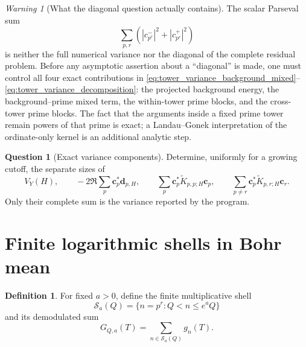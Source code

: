 \documentclass[11pt]{amsart}
\numberwithin{equation}{section}
\theoremstyle{plain}
\theoremstyle{definition}
\newtheorem{definition}[theorem]{Definition}
\newtheorem{question}[theorem]{Question}
\theoremstyle{remark}
\newtheorem{warning}[theorem]{Warning}
\newcommand{\1}{\mathbf{1}}
\begin{document}
\begin{warning}[What the diagonal question actually contains]
\label{warn:diagonal_issue}
The scalar Parseval sum
\begin{equation}
\sum_{p,r}
\left(|c_{p^r}^-|^2+|c_{p^r}^+|^2\right)
\label{eq:ordinary_parseval_diagonal}
\end{equation}
is neither the full numerical variance nor the diagonal of the complete
residual problem.  Before any asymptotic assertion about a ``diagonal'' is
made, one must control all four exact contributions in
\eqref{eq:tower_variance_background_mixed}--
\eqref{eq:tower_variance_decomposition}: the projected background energy,
the background--prime mixed term, the within-tower prime blocks, and the
cross-tower prime blocks.  The fact that the arguments inside a fixed
prime tower remain powers of that prime is exact; a Landau--Gonek
interpretation of the ordinate-only kernel is an additional analytic step.
\end{warning}

\begin{question}[Exact variance components]
\label{question:tower_block_energy}
Determine, uniformly for a growing cutoff, the separate sizes of
\begin{equation}
V_Y(H),
\qquad
-2\Re\sum_p\mathbf c_p^\ast\mathbf d_{p,H},
\qquad
\sum_p\mathbf c_p^\ast\widetilde K_{p,p;H}\mathbf c_p,
\qquad
\sum_{p\neq r}\mathbf c_p^\ast\widetilde K_{p,r;H}\mathbf c_r.
\label{eq:four_variance_components}
\end{equation}
Only their complete sum is the variance reported by the program.
\end{question}

\section{Finite logarithmic shells in Bohr mean}
\label{sec:shell_calculation}

\begin{definition}
\label{def:short_shell}
For fixed \(a>0\), define the finite multiplicative shell
\begin{equation}
\mathcal S_a(Q)
=
\{n=p^r:Q<n\leq e^aQ\}
\label{eq:short_shell}
\end{equation}
and its demodulated sum
\begin{equation}
G_{Q,a}(T)
=
\sum_{n\in\mathcal S_a(Q)}g_n(T).
\label{eq:shell_sum}
\end{equation}
\end{definition}
\end{document}
